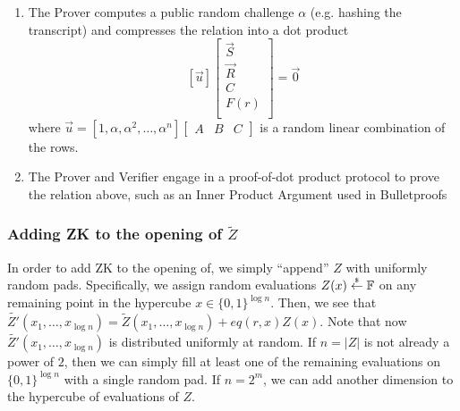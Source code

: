 \begin{mdframed}[style=zkprotocolwithheader, frametitle=Adding ZK to sumcheck]
\begin{enumerate}
    \item The Prover computes a public random challenge $\alpha$ (e.g. hashing the transcript) and compresses the relation into a dot product
    \begin{equation} \label{eqn:rlc-vector-reln}
        [\vec{u}]
        \left[\begin{array}{c}
            \vec{S} \\
            \hline
            \vec{R} \\
            \hline
            C \\
            F(r) \\
        \end{array}\right]
        = 
        \vec{0}
    \end{equation}
    where $\vec{u} = [1, \alpha, \alpha^2, \dots, \alpha^n] \left[\begin{array}{c|c|c}
        A & B & C
    \end{array}\right]$ is a random linear combination of the rows.
    \item The Prover and Verifier engage in a proof-of-dot product protocol to prove the relation above, such as an Inner Product Argument used in Bulletproofs \cite{cryptoeprint:2017/1066}
    \end{enumerate}
\end{mdframed}

\subsubsection{Adding ZK to the opening of $\widetilde{Z}$}\label{subsubsec:zk-open-Z}

In order to add ZK to the opening of, we simply ``append'' $Z$ with uniformly random pads. 
Specifically, we assign random evaluations $Z(x) \overset{{\scriptscriptstyle\$}}{\leftarrow} \mathbb{F}$ on any remaining point in the hypercube $x \in \{0,1\}^{\log n}$.
Then, we see that $\widetilde{Z'}(x_1, \dots, x_{\log n}) = \widetilde{Z}(x_1, \dots, x_{\log n}) + eq(r, x)Z(x)$. 
Note that now $\widetilde{Z'}(x_1, \dots, x_{\log n})$ is distributed uniformly at random.
If $n=|Z|$ is not already a power of $2$, then we can simply fill at least one of the remaining evaluations on $\{0,1\}^{\log n}$ with a single random pad. 
If $n=2^m$, we can add another dimension to the hypercube of evaluations of $Z$. 


